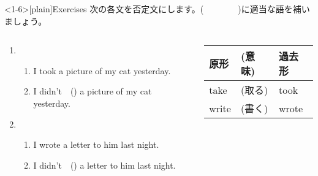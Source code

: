 \documentclass[aspectratio=169,xcolor={dvipsnames,table}]{beamer}
\begin{document}
\begin{frame}<1-6>[plain]{Exercises}
 次の各文を否定文にします。(~~~~~~~~)に適当な語を補いましょう。

\begin{columns}
\begin{column}{.6\textwidth}
\begin{enumerate}
 \item \begin{enumerate}
	\item I took a picture of my cat yesterday.
	\item I didn't~~() a picture of my cat yesterday.
       \end{enumerate}
 \item \begin{enumerate}
	\item I wrote a letter to him last night.
	\item I didn't~~() a letter to him last night.
       \end{enumerate}
\end{enumerate}
\end{column}
\begin{column}{.35\textwidth}
{
\begin{tabular}{lll}\toprule
{\small 原形}&{\small (意味)}&{\small 過去形}\\\midrule
{take}&{{\small (取る)}}&{took}\\
{write}&{{\small (書く)}}&{wrote}\\
\bottomrule
\end{tabular}}%

\end{column}
\end{columns}
\end{frame}
\end{document}
